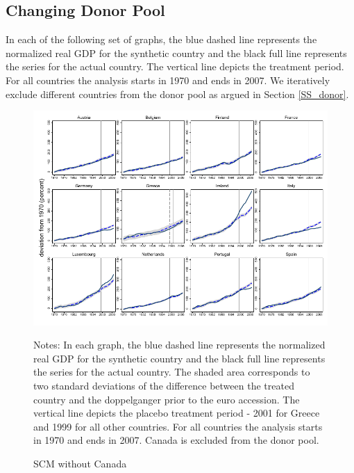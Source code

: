 \documentclass[12pt]{article}
\newcommand{\annote}[1]{\parbox{\textwidth}{\renewcommand{\baselinestretch}{1.0}\vspace{12pt} \small Notes: #1}}
\begin{document}
\begin{appendices}
\subsection{Changing Donor Pool \label{SS_donor_appendix}}
In each of the following set of graphs, the blue dashed line represents the normalized real GDP for the synthetic country and the black full line represents the series for the actual country. The vertical line depicts the treatment period. For all countries the analysis starts in 1970 and ends in 2007. We iteratively exclude different countries from the donor pool as argued in Section \ref{SS_donor}.

\begin{figure}[h!]
    \centering
    \label{F_CAN}
    \caption{SCM without Canada}
    \includegraphics[scale=0.7]{Output/Figures/SCM_gdp_Rob_1999_Annual_CAN.pdf}
     \annote{In each graph, the blue dashed line represents the normalized real GDP for the synthetic country and the black full line represents the series for the actual country. The shaded area corresponds to two standard deviations of the difference between the treated country and the doppelganger prior to the euro accession. The vertical line depicts the placebo treatment period - 2001 for Greece and 1999 for all other countries. For all countries the analysis starts in 1970 and ends in 2007. Canada is excluded from the donor pool. }
\end{figure}


\end{appendices}
\end{document}
